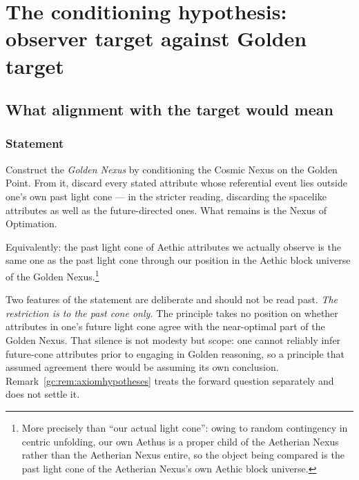 \section{The conditioning hypothesis: observer target against Golden target}\label{sec:conditioning}

\subsection{What alignment with the target would mean}\label{gc:sub:pastalign}

\subsubsection{Statement}\label{gc:subsub:pastalign-statement}

\begin{principle}
\label{gc:prin:pastalign}
Construct the \emph{Golden Nexus} by conditioning the Cosmic Nexus on
the Golden Point. From it, discard every stated attribute whose
referential event lies outside one's own past light cone --- in the
stricter reading, discarding the spacelike attributes as well as the
future-directed ones. What remains is the Nexus of Optimation.

Equivalently: the past light cone of Aethic attributes we actually
observe is the same one as the past light cone through our position in
the Aethic block universe of the Golden Nexus.\footnote{More precisely
than ``our actual light cone'': owing to random contingency in centric
unfolding, our own Aethus is a proper child of the Aetherian Nexus
rather than the Aetherian Nexus entire, so the object being compared is
the past light cone of the Aetherian Nexus's own Aethic block universe.}
\end{principle}

Two features of the statement are deliberate and should not be read past. \emph{The restriction is to the past cone only.} The principle takes no
position on whether attributes in one's future light cone agree with the
near-optimal part of the Golden Nexus. That silence is not modesty but
scope: one cannot reliably infer future-cone attributes prior to
engaging in Golden reasoning, so a principle that assumed agreement
there would be assuming its own conclusion.
Remark~\ref{gc:rem:axiomhypotheses} treats the forward question separately and
does not settle it.


